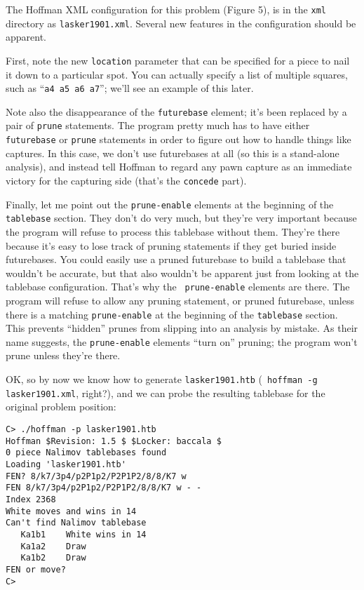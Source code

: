\documentclass[11pt]{article}
\begin{document}
The Hoffman XML configuration for this problem (Figure 5), is in the
{\tt xml} directory as {\tt lasker1901.xml}.  Several new
features in the configuration should be apparent.

First, note the new {\tt location} parameter that can be specified for
a piece to nail it down to a particular spot.  You can actually
specify a list of multiple squares, such as ``{\tt a4 a5 a6 a7}'';
we'll see an example of this later.

Note also the disappearance of the {\tt futurebase} element; it's been
replaced by a pair of {\tt prune} statements.  The program pretty much
has to have either {\tt futurebase} or {\tt prune} statements in order
to figure out how to handle things like captures.  In this case, we
don't use futurebases at all (so this is a stand-alone analysis), and
instead tell Hoffman to regard any pawn capture as an immediate
victory for the capturing side (that's the {\tt concede} part).

Finally, let me point out the {\tt prune-enable} elements at the
beginning of the {\tt tablebase} section.  They don't do very much,
but they're very important because the program will refuse to process
this tablebase without them.  They're there because it's easy to lose
track of pruning statements if they get buried inside futurebases.
You could easily use a pruned futurebase to build a tablebase that
wouldn't be accurate, but that also wouldn't be apparent just from
looking at the tablebase configuration.  That's why the {\tt
prune-enable} elements are there.  The program will refuse to allow
any pruning statement, or pruned futurebase, unless there is a
matching {\tt prune-enable} at the beginning of the {\tt tablebase}
section.  This prevents ``hidden'' prunes from slipping into an
analysis by mistake.  As their name suggests, the {\tt prune-enable}
elements ``turn on'' pruning; the program won't prune unless they're there.

OK, so by now we know how to generate {\tt lasker1901.htb} ({\tt
hoffman -g lasker1901.xml}, right?), and we can probe the resulting
tablebase for the original problem position:

\begin{verbatim}
C> ./hoffman -p lasker1901.htb
Hoffman $Revision: 1.5 $ $Locker: baccala $
0 piece Nalimov tablebases found
Loading 'lasker1901.htb'
FEN? 8/k7/3p4/p2P1p2/P2P1P2/8/8/K7 w
FEN 8/k7/3p4/p2P1p2/P2P1P2/8/8/K7 w - -
Index 2368
White moves and wins in 14
Can't find Nalimov tablebase
   Ka1b1    White wins in 14
   Ka1a2    Draw
   Ka1b2    Draw
FEN or move?
C>
\end{verbatim}
\end{document}
